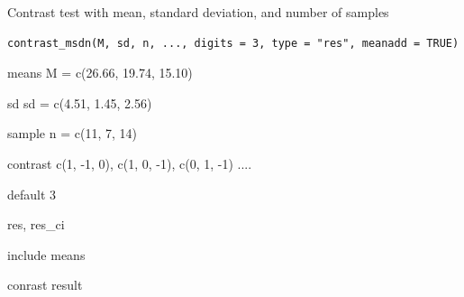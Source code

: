 \documentclass[a4paper]{book}
\begin{document}
%
\begin{Description}
Contrast test with mean, standard deviation, and number of samples
\end{Description}
%
\begin{Usage}
\begin{verbatim}
contrast_msdn(M, sd, n, ..., digits = 3, type = "res", meanadd = TRUE)
\end{verbatim}
\end{Usage}
%
\begin{Arguments}
\begin{ldescription}
\item[\code{M}] means M = c(26.66, 19.74, 15.10)

\item[\code{sd}] sd  sd = c(4.51, 1.45, 2.56)

\item[\code{n}] sample  n = c(11, 7, 14)

\item[\code{...}] contrast c(1, -1,  0), c(1,  0, -1), c(0,  1, -1) ....

\item[\code{digits}] default 3

\item[\code{type}] res, res\_ci

\item[\code{meanadd}] include means
\end{ldescription}
\end{Arguments}
%
\begin{Value}
conrast result
\end{Value}
%
\end{document}
